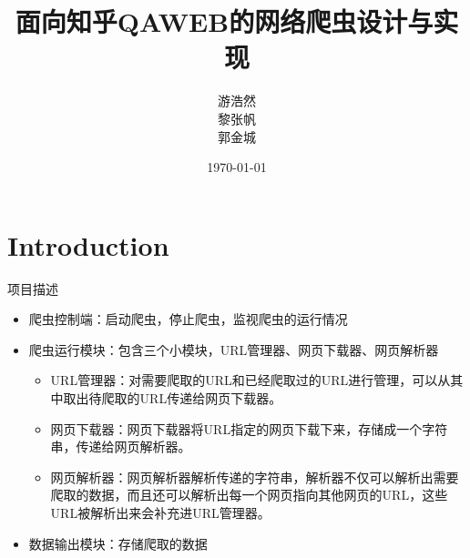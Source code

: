 \documentclass[aspectratio=169]{beamer}
\title[电信提高1501]{面向知乎QAWEB的网络爬虫设计与实现}
\author{游浩然 \\ 黎张帆 \\ 郭金城\\}
\institute[\bf HUST]{u201515429\quad u201514574\quad u201511174\quad @hust.edu.cn}
\date{\today}
\begin{document}
\begin{frame}
  \titlepage
\end{frame}




\section{Introduction}
\begin{frame}{项目描述}
\begin{itemize}
  \item 爬虫控制端：启动爬虫，停止爬虫，监视爬虫的运行情况
  \item 爬虫运行模块：包含三个小模块，URL管理器、网页下载器、网页解析器
  \begin{itemize}
    \item URL管理器：对需要爬取的URL和已经爬取过的URL进行管理，可以从其中取出待爬取的URL传递给网页下载器。
    \item 网页下载器：网页下载器将URL指定的网页下载下来，存储成一个字符串，传递给网页解析器。
    \item 网页解析器：网页解析器解析传递的字符串，解析器不仅可以解析出需要爬取的数据，而且还可以解析出每一个网页指向其他网页的URL，这些URL被解析出来会补充进URL管理器。
  \end{itemize}
  \item 数据输出模块：存储爬取的数据
\end{itemize}
\end{frame}
\end{document}
